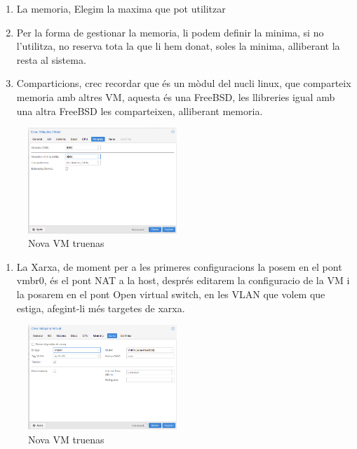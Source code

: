 \documentclass[
  10pt,
]{krantz}
\providecommand{\tightlist}{%
  \setlength{\itemsep}{0pt}\setlength{\parskip}{0pt}}
\begin{document}
\begin{enumerate}
\def\labelenumi{\arabic{enumi}.}
\setcounter{enumi}{13}
\tightlist
\item
  La memoria, Elegim la maxima que pot utilitzar
\item
  Per la forma de gestionar la memoria, li podem definir la minima, si no l'utilitza, no reserva tota la que li hem donat, soles la minima, alliberant la resta al sistema.
\item
  Comparticions, crec recordar que és un mòdul del nucli linux, que comparteix memoria amb altres VM, aquesta és una FreeBSD, les llibreries igual amb una altra FreeBSD les comparteixen, alliberant memoria.
\end{enumerate}

\begin{figure}
\centering
\includegraphics[width=0.5\textwidth,height=\textheight]{imatges/proxmox/install_truenas6.png}
\caption{Nova VM truenas}
\end{figure}

\begin{enumerate}
\def\labelenumi{\arabic{enumi}.}
\setcounter{enumi}{16}
\tightlist
\item
  La Xarxa, de moment per a les primeres configuracions la posem en el pont vmbr0, és el pont NAT a la host, després editarem la configuracio de la VM i la posarem en el pont Open virtual switch, en les VLAN que volem que estiga, afegint-li més targetes de xarxa.
\end{enumerate}

\begin{figure}
\centering
\includegraphics[width=0.5\textwidth,height=\textheight]{imatges/proxmox/install_truenas7.png}
\caption{Nova VM truenas}
\end{figure}
\end{document}
